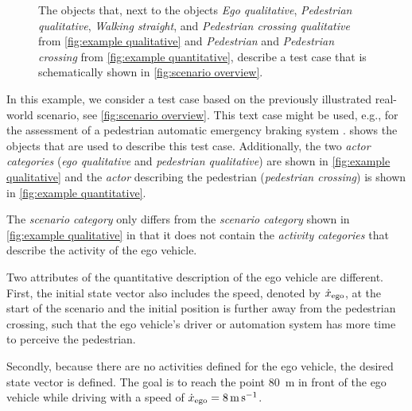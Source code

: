 \begin{figure}
	\centering
	
	\caption{The objects that, next to the objects \emph{Ego qualitative}, \emph{Pedestrian qualitative}, \emph{Walking straight}, and \emph{Pedestrian crossing qualitative} from \cref{fig:example qualitative} and \emph{Pedestrian} and \emph{Pedestrian crossing} from \cref{fig:example quantitative}, describe a test case that is schematically shown in \cref{fig:scenario overview}.}
	\label{fig:example test case}
\end{figure}


In this example, we consider a test case based on the previously illustrated real-world scenario, see \cref{fig:scenario overview}. This text case might be used, e.g., for the assessment of a pedestrian automatic emergency braking system \autocite{seiniger2015test}.  shows the objects that are used to describe this test case. Additionally, the two \textit{actor categories} (\emph{ego qualitative} and \emph{pedestrian qualitative}) are shown in \cref{fig:example qualitative} and the \textit{actor} describing the pedestrian (\emph{pedestrian crossing}) is shown in \cref{fig:example quantitative}.



The \textit{scenario category} only differs from the \textit{scenario category} shown in \cref{fig:example qualitative} in that it does not contain the \textit{activity categories} that describe the activity of the ego vehicle.

Two attributes of the quantitative description of the ego vehicle are different. First, the initial state \cstart vector \cend also includes the speed, denoted by $\dot{x}_{\mathrm{ego}}$, at the start of the scenario and the initial position is further away from the pedestrian crossing, such that the ego vehicle's driver or automation system has more time to perceive the pedestrian. 


Secondly, because there are no activities defined for the ego vehicle, the desired \cstart state vector is \cend defined. The goal is to reach the point \SI{80}{\meter} in front of the ego vehicle while driving with a speed of $\dot{x}_{\mathrm{ego}}=\SI{8}{\meter\per\second}$.

